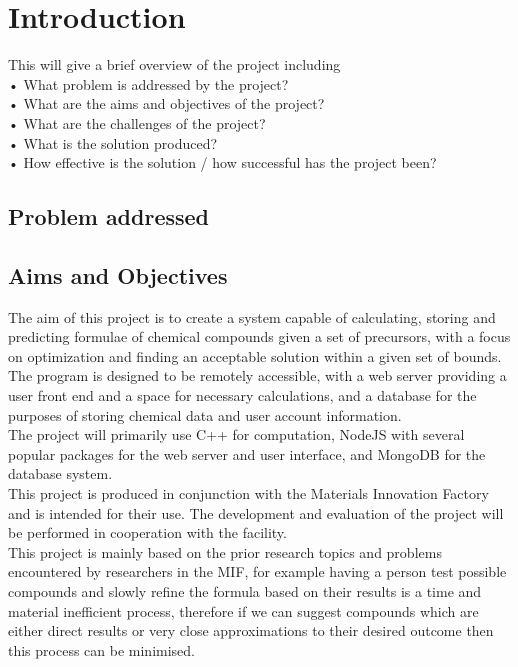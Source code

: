 \chapter{Introduction}
\label{ch:intro}

This will give a brief overview of the project including\\
• What problem is addressed by the project?\\
• What are the aims and objectives of the project?\\
• What are the challenges of the project?\\
• What is the solution produced?\\
• How effective is the solution / how successful has the project been?\\

\section{Problem addressed}

\section{Aims and Objectives}
The aim of this project is to create a system capable of calculating, storing and predicting formulae of chemical compounds given a set of precursors, with a focus on optimization and finding an acceptable solution within a given set of bounds. The program is designed to be remotely accessible, with a web server providing a user front end and a space for necessary calculations, and a database for the purposes of storing chemical data and user account information. \\

The project will primarily use C++ for computation, NodeJS with several popular packages for the web server and user interface, and MongoDB for the database system. \\

This project is produced in conjunction with the Materials Innovation Factory and is intended for their use. The development and evaluation of the project will be performed in cooperation with the facility. \\

This project is mainly based on the prior research topics and problems encountered by researchers in the MIF, for example having a person test possible compounds and slowly refine the formula based on their results is a time and material inefficient process, therefore if we can suggest compounds which are either direct results or very close approximations to their desired outcome then this process can be minimised. \\

